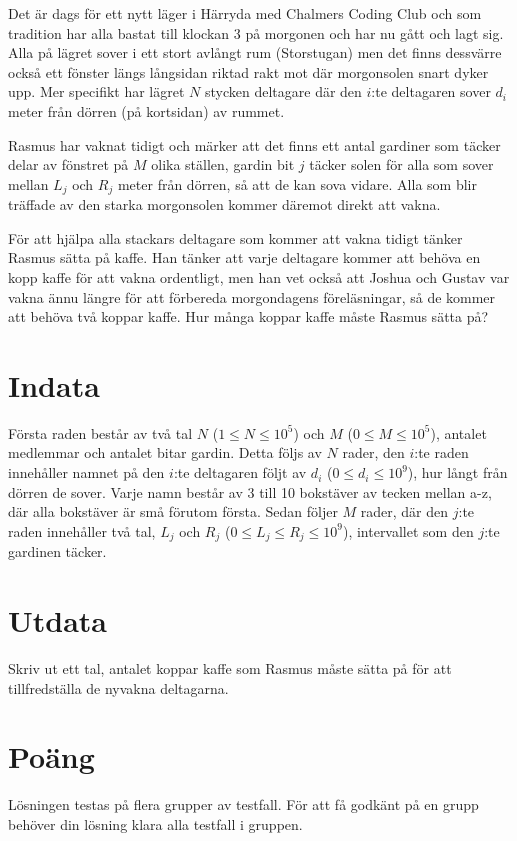 
Det är dags för ett nytt läger i Härryda med Chalmers Coding Club och som tradition har alla bastat till klockan 3 på
morgonen och har nu gått och lagt sig. Alla på lägret sover i ett stort avlångt rum (Storstugan) men det finns dessvärre
också ett fönster längs långsidan riktad rakt mot där morgonsolen snart dyker upp. Mer specifikt har lägret $N$ stycken
deltagare där den $i$:te deltagaren sover $d_i$ meter från dörren (på kortsidan) av rummet.


Rasmus har vaknat tidigt och märker att det finns ett antal gardiner som täcker delar av fönstret på $M$ olika ställen,
gardin bit $j$ täcker solen för alla som sover mellan $L_j$ och $R_j$ meter från dörren, så att de kan sova vidare. Alla
som blir träffade av den starka morgonsolen kommer däremot direkt att vakna.

För att hjälpa alla stackars deltagare som kommer att vakna tidigt tänker Rasmus sätta på kaffe. Han tänker att varje
deltagare kommer att behöva en kopp kaffe för att vakna ordentligt, men han vet också att Joshua och Gustav
var vakna ännu längre för att förbereda morgondagens föreläsningar, så de kommer att behöva två koppar kaffe. Hur
många koppar kaffe måste Rasmus sätta på?


\section*{Indata}
Första raden består av två tal $N$ ($1 \le N \le 10^5$) och $M$ ($0 \le M \le 10^5$), antalet medlemmar och antalet bitar gardin. Detta följs
av $N$ rader, den $i$:te raden innehåller namnet på den $i$:te deltagaren följt av $d_i$ ($0 \le d_i \le 10^9$), hur långt
från dörren de sover. Varje namn består av 3 till 10 bokstäver av tecken mellan a-z, där alla bokstäver är små förutom första.
Sedan följer $M$ rader, där den $j$:te raden innehåller två tal, $L_j$ och $R_j$ ($0 \le L_j \le R_j \le 10^9$),
intervallet som den $j$:te gardinen täcker.

\section*{Utdata}
Skriv ut ett tal, antalet koppar kaffe som Rasmus måste sätta på för att tillfredställa de nyvakna deltagarna.

\section*{Poäng}
Lösningen testas på flera grupper av testfall. För att få godkänt på en grupp behöver din lösning
klara alla testfall i gruppen.

